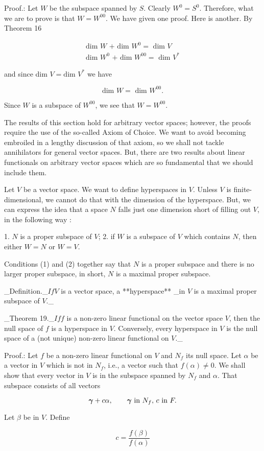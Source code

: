 Proof.: Let \(W\) be the subspace spanned by \(S\). Clearly \(W^{0}=S^{0}\). Therefore, what we are to prove is that \(W=W^{00}\). We have given one proof. Here is another. By Theorem 16

\[\begin{array}{c}\mbox{dim }W\mbox{ + dim }W^{0}=\mbox{ dim }V\\ \mbox{dim }W^{0}\mbox{ + dim }W^{00}=\mbox{ dim }V^{*}\end{array}\]

and since dim \(V=\mbox{dim }V^{*}\) we have

\[\mbox{dim }W=\mbox{ dim }W^{00}.\]

Since \(W\) is a subspace of \(W^{00}\), we see that \(W=W^{00}\). 

The results of this section hold for arbitrary vector spaces; however, the proofs require the use of the so-called Axiom of Choice. We want to avoid becoming embroiled in a lengthy discussion of that axiom, so we shall not tackle annihilators for general vector spaces. But, there are two results about linear functionals on arbitrary vector spaces which are so fundamental that we should include them.

Let \(V\) be a vector space. We want to define hyperspaces in \(V\). Unless \(V\) is finite-dimensional, we cannot do that with the dimension of the hyperspace. But, we can express the idea that a space \(N\) falls just one dimension short of filling out \(V\), in the following way :

1. \(N\) is a proper subspace of \(V\);
2. if \(W\) is a subspace of \(V\) which contains \(N\), then either \(W=N\) or \(W=V\).

Conditions (1) and (2) together say that \(N\) is a proper subspace and there is no larger proper subspace, in short, \(N\) is a maximal proper subspace.

_Definition._\(If\)\(V\) is a vector space, a **hyperspace** _in \(V\) is a maximal proper subspace of \(V\)._

_Theorem 19._\(If\)\(f\) is a non-zero linear functional on the vector space \(V\), then the null space of \(f\) is a hyperspace in \(V\). Conversely, every hyperspace in \(V\) is the null space of a (not unique) non-zero linear functional on \(V\)._

Proof.: Let \(f\) be a non-zero linear functional on \(V\) and \(N_{f}\) its null space. Let \(\alpha\) be a vector in \(V\) which is not in \(N_{f}\), i.e., a vector such that \(f(\alpha)\neq 0\). We shall show that every vector in \(V\) is in the subspace spanned by \(N_{f}\) and \(\alpha\). That subspace consists of all vectors

\[\mbox{\boldmath$\gamma$}+c\alpha,\qquad\mbox{\boldmath$\gamma$}\mbox{ in }N_{f},\,c\mbox{ in }F.\]

Let \(\beta\) be in \(V\). Define

\[c=\frac{f(\beta)}{f(\alpha)}\] 